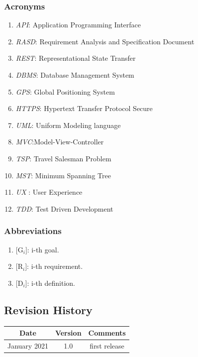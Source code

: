 \documentclass[a4paper, 12pt, oneside, table]{article}
\begin{document}
\subsubsection{Acronyms}
\begin{enumerate}[label={A.\arabic{*}}]
\item \label{def:API}\textit{API}: Application Programming Interface
\item \label{def:RASD}\textit{RASD}: Requirement Analysis and Specification Document
\item \label{def:REST}\textit{REST}: Representational State Transfer
\item \label{def:DBMS}\textit{DBMS}: Database Management System
\item \label{def:GPS} \textit{GPS}: Global Positioning System
\item \label{def:HTTPS}\textit{HTTPS}: Hypertext Transfer Protocol Secure
\item \label{def:UML}\textit{UML}: Uniform Modeling language
\item \label{def:MVC}\textit{MVC}:Model-View-Controller
\item \label{def:TSP} \textit{TSP}: Travel Salesman Problem
\item \label{def:MST} \textit{MST}: Minimum Spanning Tree
\item \label{def:UX}\textit{UX} : User Experience
\item \label{def:TDD} \textit{TDD}: Test Driven Development
\end{enumerate}

\subsubsection{Abbreviations}
\begin{enumerate}[label={AB.\arabic{*}}]
\item $[$G$_i]$: i-th goal.
\item $[$R$_i]$: i-th requirement.
\item $[$D$_i]$: i-th definition.
\end{enumerate}

\subsection{Revision History}
\begin{center}
 \begin{tabular}{||c c c||}
 \hline
 Date & Version & Comments \\ [0.5ex] 
 \hline\hline
 January 2021 & 1.0 & first release \\ 
 \hline
 \hline
\end{tabular}
\end{center}
\end{document}
